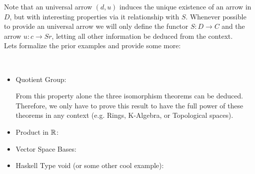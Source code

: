   Note that an universal arrow $(d,u)$ induces the unique existence of an arrow in $D$, but with interesting properties via it relationship with $S$. Whenever possible to provide an universal arrow we will only define the functor $S:D\to C$ and the arrow $u:c\to Sr$, letting all other information be deduced from the context.\\


  Lets formalize the prior examples and provide some more:

  \begin{example}\ 
    \begin{itemize}
    \item Quotient Group:

      From this property alone the three isomorphism theorems can be deduced. Therefore, we only have to prove this result to have the full power of these theorems in any context (e.g. Rings, K-Algebra, or Topological spaces).
    \item Product in $\mathbb{R}$:\label{example product}
    \item Vector Space Bases:
    \item Haskell Type void (or some other cool example):
    \end{itemize}
  \end{example}
  
